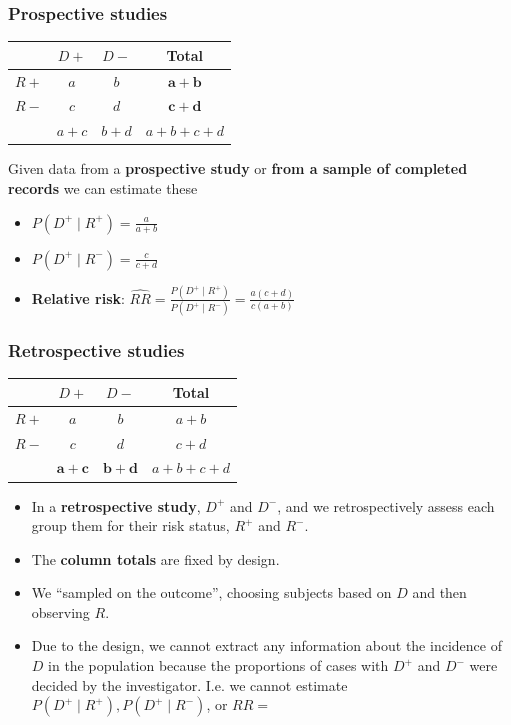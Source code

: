 \documentclass[a4paper]{article}\usepackage[]{graphicx}\usepackage[]{xcolor}
\begin{document}
\subsubsection{Prospective studies}
\begin{table}[H]
	\centering
	\begin{tabular}{@{}cccc@{}}
	\toprule
		     & \( D+ \)  & \( D- \)  & Total \\ \midrule
	\( R+ \) & \( a \)   & \( b \)   & \textcolor{myred}{\( \mathbf{a + b} \)} \\
	\( R- \) & \( c \)   & \( d \)   & \textcolor{myred}{\( \mathbf{c + d} \)} \\
		     & \( a+c \) & \( b+d \) & \( a + b + c + d \) \\ \bottomrule
	\end{tabular}
\end{table}
Given data from a \textcolor{myred}{\textbf{prospective study}} or \textcolor{myred}{\textbf{from a sample of completed records}} we can estimate these
\begin{itemize}
	\item \( P(D^+ \mid R^+) = \frac{a}{a+b} \)
	\item \( P(D^+ \mid R^-) = \frac{c}{c+d} \) 
	\item \textbf{Relative risk}: \( \widehat{RR} = \frac{P(D^+ \mid R^+)}{P(D^+ \mid R^-)} = \frac{a(c+d)}{c(a+b)} \) 
\end{itemize}
\subsubsection{Retrospective studies}
\begin{table}[H]
	\centering
	\begin{tabular}{@{}cccc@{}}
	\toprule
		     & \( D+ \)  & \( D- \)  & Total \\ \midrule
	\( R+ \) & \( a \)   & \( b \)   & \( a + b \) \\
	\( R- \) & \( c \)   & \( d \)   & \( c + d \) \\
		     & \textcolor{mygreen}{\( \mathbf{a + c} \)} & \textcolor{mygreen}{\( \mathbf{b + d} \)} & \( a + b + c + d \) \\ \bottomrule
	\end{tabular}
\end{table}
\begin{itemize}
	\item In a \textcolor{mygreen}{\textbf{retrospective study}}, \( D^+ \) and \( D^- \), and we retrospectively assess each group them for their risk status, \( R^+ \) and \( R^- \).
	\item The \textcolor{mygreen}{\textbf{column totals}} are fixed by design.
	\item We ``sampled on the outcome'', choosing subjects based on \( D \) and then observing \( R \).
	\item Due to the design, we cannot extract any information about the incidence of \( D \) in the population because the proportions of cases with \( D^+ \) and \( D^- \) were decided by the investigator. I.e. we cannot estimate \( P( D^+ \mid R^+), P(D^+ \mid R^-) \), or \( RR =  \) 
\end{itemize}
\end{document}
